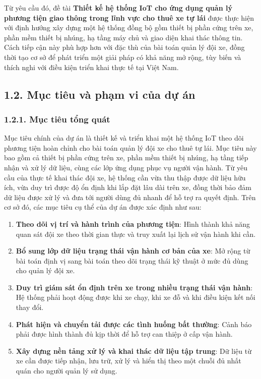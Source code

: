 \documentclass[a4paper]{extarticle}
\providecommand{\tightlist}{%
  \setlength{\itemsep}{0pt}\setlength{\parskip}{0pt}}
\begin{document}
Từ yêu cầu đó, đề tài \textbf{Thiết kế hệ thống IoT cho ứng dụng quản lý
phương tiện giao thông trong lĩnh vực cho thuê xe tự lái} được thực
hiện với định hướng xây dựng một hệ thống đồng bộ gồm thiết bị phần cứng
trên xe, phần mềm thiết bị nhúng, hạ tầng máy chủ và giao diện khai thác
thông tin. Cách tiếp cận này phù hợp hơn với đặc thù của bài toán quản
lý đội xe, đồng thời tạo cơ sở để phát triển một giải pháp có khả năng
mở rộng, tùy biến và thích nghi với điều kiện triển khai thực tế tại Việt
Nam.


\subsection{1.2. Mục tiêu và phạm vi của dự án}\label{mux1ee5c-tiuxeau-vuxe0-phux1ea1m-vi-cux1ee7a-dux1ef1-uxe1n}

\subsubsection{1.2.1. Mục tiêu tổng quát}\label{mux1ee5c-tiuxeau-tux1ed5ng-quuxe1t}

Mục tiêu chính của dự án là thiết kế và triển khai một hệ thống IoT theo
dõi phương tiện hoàn chỉnh cho bài toán quản lý đội xe cho thuê tự lái.
Mục tiêu này bao gồm cả thiết bị phần cứng trên xe, phần mềm thiết bị
nhúng, hạ tầng tiếp nhận và xử lý dữ liệu, cùng các lớp ứng dụng phục vụ
người vận hành. Từ yêu cầu của thực tế khai thác đội xe, hệ thống cần
vừa thu thập được dữ liệu hữu ích, vừa duy trì được độ ổn định khi lắp
đặt lâu dài trên xe, đồng thời bảo đảm dữ liệu được xử lý và đưa tới
người dùng đủ nhanh để hỗ trợ ra quyết định. Trên cơ sở đó, các mục tiêu
cụ thể của dự án được xác định như sau:

\begin{enumerate}
\def\labelenumi{\arabic{enumi}.}
\tightlist
\item
  \textbf{Theo dõi vị trí và hành trình của phương tiện}: Hình thành khả
  năng quan sát đội xe theo thời gian thực và truy xuất lại lịch sử vận
  hành khi cần.
\item
  \textbf{Bổ sung lớp dữ liệu trạng thái vận hành cơ bản của xe}: Mở rộng từ
  bài toán định vị sang bài toán theo dõi trạng thái kỹ thuật ở mức đủ
  dùng cho quản lý đội xe.
\item
  \textbf{Duy trì giám sát ổn định trên xe trong nhiều trạng thái vận hành}:
  Hệ thống phải hoạt động được khi xe chạy, khi xe đỗ và khi điều kiện
  kết nối thay đổi.
\item
  \textbf{Phát hiện và chuyển tải được các tình huống bất thường}: Cảnh báo
  phải được hình thành đủ kịp thời để hỗ trợ can thiệp ở cấp vận hành.
\item
  \textbf{Xây dựng nền tảng xử lý và khai thác dữ liệu tập trung}: Dữ liệu từ
  xe cần được tiếp nhận, lưu trữ, xử lý và hiển thị theo một chuỗi đủ
  nhất quán cho người quản lý sử dụng.
\end{enumerate}
\end{document}
